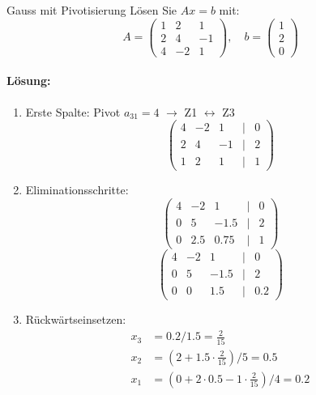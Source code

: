 \begin{example2}{Gauss mit Pivotisierung}
Lösen Sie $Ax = b$ mit:
$$A = \begin{pmatrix} 
1 & 2 & 1 \\
2 & 4 & -1 \\
4 & -2 & 1
\end{pmatrix}, \quad b = \begin{pmatrix} 1 \\ 2 \\ 0 \end{pmatrix}$$

\paragraph{Lösung:}
\begin{enumerate}
    \item Erste Spalte: Pivot $a_{31} = 4$ $\rightarrow$ Z1 $\leftrightarrow $ Z3
    $$\begin{pmatrix} 
    4 & -2 & 1 & | & 0 \\
    2 & 4 & -1 & | & 2 \\
    1 & 2 & 1 & | & 1
    \end{pmatrix}$$
    
    \item Eliminationsschritte:
    $$\begin{pmatrix} 
    4 & -2 & 1 & | & 0 \\
    0 & 5 & -1.5 & | & 2 \\
    0 & 2.5 & 0.75 & | & 1
    \end{pmatrix}$$
    $$\begin{pmatrix} 
    4 & -2 & 1 & | & 0 \\
    0 & 5 & -1.5 & | & 2 \\
    0 & 0 & 1.5 & | & 0.2
    \end{pmatrix}$$
    
    \item Rückwärtseinsetzen:
    \begin{align*}
        x_3 &= 0.2/1.5 = \frac{2}{15} \\
        x_2 &= (2 + 1.5 \cdot \frac{2}{15})/5 = 0.5 \\
        x_1 &= (0 + 2 \cdot 0.5 - 1 \cdot \frac{2}{15})/4 = 0.2
    \end{align*}
\end{enumerate}
\end{example2}

